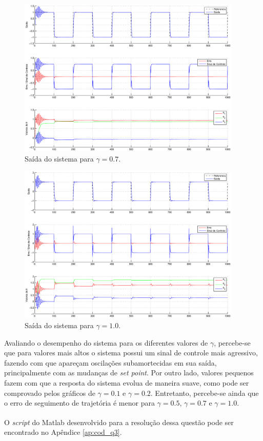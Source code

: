 \begin{figure}[htb]
    \centering
    \includegraphics[width=0.95\textwidth]{imgs/questao3/saida_gamma_0.7.eps}
    \caption{Saída do sistema para $\gamma = 0.7$.}
    \label{fig:q3_saida_gamma_0.7}
\end{figure}

\begin{figure}[H]
    \centering
    \includegraphics[width=0.95\textwidth]{imgs/questao3/saida_gamma_1.0.eps}
    \caption{Saída do sistema para $\gamma = 1.0$.}
    \label{fig:q3_saida_gamma_1.0}
\end{figure}

Avaliando o desempenho do sistema para os diferentes valores de $\gamma$,
percebe-se que para valores mais altos o sistema possui um sinal de controle
mais agressivo, fazendo com que apareçam oscilações subamortecidas em sua
saída, principalmente com as mudanças de {\it set point}. Por outro lado,
valores pequenos fazem com que a resposta do sistema evolua de maneira suave,
como pode ser comprovado pelos gráficos de $\gamma = 0.1$ e $\gamma = 0.2$.
Entretanto, percebe-se ainda que o erro de seguimento de trajetória é menor para
$\gamma = 0.5$, $\gamma = 0.7$ e $\gamma = 1.0$.

O {\it script} do Matlab\textsuperscript{\textregistered} desenvolvido para a
resolução dessa questão pode ser encontrado no Apêndice \ref{ap:cod_q3}.
